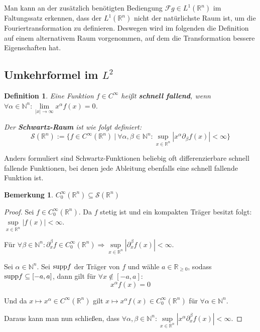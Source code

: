 \documentclass{article}
\newcommand{\R}[0]{\mathbb{R}}
\newcommand{\N}[0]{\mathbb{N}}
\newcommand{\Ssp}[0]{\mathcal{S}}
\newcommand{\C}[0]{C^{\infty}_0}
\newtheorem{defin}{Definition}
\newtheorem{bem}{Bemerkung}
\begin{document}
Man kann an der zusätzlich benötigten Bediengung $\mathcal{F}g \in L^1(\R^n)$ im Faltungssatz erkennen, dass der $L^1(\R^n)$ nicht der natürlichste Raum ist, um die Fouriertransformation zu definieren.
Deswegen wird im folgenden die Definition auf einem alternativem Raum vorgenommen, auf dem die Transformation bessere Eigenschaften hat.

\subsection{Umkehrformel im $L^2$}

\begin{defin}
    Eine Funktion $f \in C^{\infty}$ heißt \textbf{schnell fallend}, wenn $\forall \alpha \in \N^n: \lim\limits_{|x| \to \infty} x^{\alpha}f(x) = 0$.

    Der \textbf{Schwartz-Raum} ist wie folgt definiert:
    \begin{equation*}
        \Ssp(\R^n) := \{ f \in C^{\infty}(\R^n) \: | \: \forall \alpha,\beta \in \N^n: \sup\limits_{x \in \R^n} \left| x^\alpha\partial_{\beta}f(x) \right| < \infty \}
    \end{equation*}
\end{defin}
Anders formuliert sind Schwartz-Funktionen beliebig oft differenzierbare schnell fallende Funktionen, bei denen jede Ableitung ebenfalls eine schnell fallende Funktion ist.

\begin{bem}\label{bem:C0sub}
    $C^{\infty}_0(\R^n) \subseteq \Ssp(\R^n)$
\end{bem}

\begin{proof}
    Sei $f \in \C(\R^n)$. Da $f$ stetig ist und ein kompakten Träger besitzt folgt: $\sup\limits_{x \in \R^n} |f(x)| < \infty$.

    Für $\forall \beta \in \N^n: \partial_x^{\beta} f \in \C(\R^n) \Rightarrow \sup\limits_{x \in \R^n} |\partial_x^{\beta}f(x)| < \infty$.

    Sei $\alpha \in \N^n$. Sei ${\rm supp} f$ der Träger von $f$ und wähle $a \in \R_{\geq 0}$, sodass ${\rm supp}f \subseteq [-a, a]$, dann gilt für $\forall x \notin [-a, a]$:
    \begin{equation}
        x^{\alpha}f(x) = 0
    \end{equation}

    Und da $x \mapsto x^{\alpha} \in C^{\infty}(\R^n)$ gilt $x \mapsto x^{\alpha}f(x) \in \C(\R^n)$ für $\forall \alpha \in \N^n$.
    
    Daraus kann man nun schließen, dass $\forall \alpha, \beta \in \N^n: \sup\limits_{x \in \R^n} |x^{\alpha}\partial_x^{\beta}f(x)| < \infty$.
\end{proof}
\end{document}
